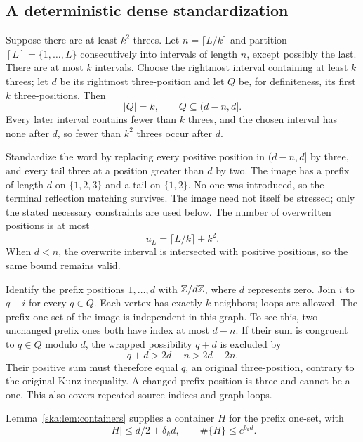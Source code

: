 \documentclass[11pt,letterpaper]{article}
\theoremstyle{definition}
\begin{document}
\subsection{A deterministic dense standardization}
Suppose there are at least $k^2$ threes. Let $n=\lceil L/k\rceil$ and partition $[L]=\{1,\ldots,L\}$ consecutively into intervals of length $n$, except possibly the last. There are at most $k$ intervals. Choose the rightmost interval containing at least $k$ threes; let $d$ be its rightmost three-position and let $Q$ be, for definiteness, its first $k$ three-positions. Then
\begin{equation}\label{ska:eq:Qwindow}
|Q|=k,\qquad Q\subseteq(d-n,d].
\end{equation}
Every later interval contains fewer than $k$ threes, and the chosen interval has none after $d$, so fewer than $k^2$ threes occur after $d$.

Standardize the word by replacing every positive position in $(d-n,d]$ by three, and every tail three at a position greater than $d$ by two. The image has a prefix of length $d$ on $\{1,2,3\}$ and a tail on $\{1,2\}$. No one was introduced, so the terminal reflection matching survives. The image need not itself be stressed; only the stated necessary constraints are used below. The number of overwritten positions is at most
\begin{equation}\label{ska:eq:overwritecount}
u_L=\lceil L/k\rceil+k^2.
\end{equation}
When $d<n$, the overwrite interval is intersected with positive positions, so the same bound remains valid.

Identify the prefix positions $1,\ldots,d$ with $\mathbb Z/d\mathbb Z$, where $d$ represents zero. Join $i$ to $q-i$ for every $q\in Q$. Each vertex has exactly $k$ neighbors; loops are allowed. The prefix one-set of the image is independent in this graph. To see this, two unchanged prefix ones both have index at most $d-n$. If their sum is congruent to $q\in Q$ modulo $d$, the wrapped possibility $q+d$ is excluded by
\[
q+d>2d-n>2d-2n.
\]
Their positive sum must therefore equal $q$, an original three-position, contrary to the original Kunz inequality. A changed prefix position is three and cannot be a one. This also covers repeated source indices and graph loops.

Lemma~\ref{ska:lem:containers} supplies a container $H$ for the prefix one-set, with
\begin{equation}\label{ska:eq:containeruse}
|H|\le d/2+\delta_kd,
\qquad\#\{H\}\le e^{b_kd}.
\end{equation}
\end{document}

